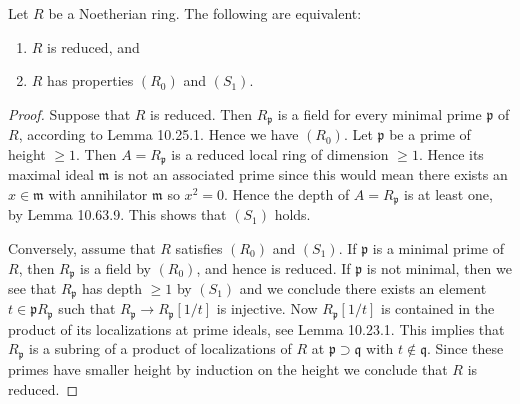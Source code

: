 \begin{lemma}[10.157.3, Tag 031R]
Let $R$ be a Noetherian ring. The following are equivalent:
\begin{enumerate}
\item $R$ is reduced, and
\item $R$ has properties $(R_0)$ and $(S_1)$.
\end{enumerate}
\end{lemma}
\begin{proof}
Suppose that $R$ is reduced. Then $R_{\mathfrak p}$ is a field for every minimal prime $\mathfrak p$ of $R$, according to Lemma 10.25.1. Hence we have $(R_0)$. Let $\mathfrak p$ be a prime of height $\geq1$. Then $A=R_{\mathfrak p}$ is a reduced local ring of dimension $\geq1$. Hence its maximal ideal $\mathfrak m$ is not an associated prime since this would mean there exists an $x\in\mathfrak m$ with annihilator $\mathfrak m$ so $x^2=0$. Hence the depth of $A=R_{\mathfrak p}$ is at least one, by Lemma 10.63.9. This shows that $(S_1)$ holds.

Conversely, assume that $R$ satisfies $(R_0)$ and $(S_1)$. If $\mathfrak p$ is a minimal prime of $R$, then $R_{\mathfrak p}$ is a field by $(R_0)$, and hence is reduced. If $\mathfrak p$ is not minimal, then we see that $R_{\mathfrak p}$ has depth $\geq1$ by $(S_1)$ and we conclude there exists an element $t\in\mathfrak pR_{\mathfrak p}$ such that $R_{\mathfrak p}\to R_{\mathfrak p}[1/t]$ is injective. Now $R_{\mathfrak p}[1/t]$ is contained in the product of its localizations at prime ideals, see Lemma 10.23.1. This implies that $R_{\mathfrak p}$ is a subring of a product of localizations of $R$ at $\mathfrak p\supset\mathfrak q$ with $t\notin\mathfrak q$. Since these primes have smaller height by induction on the height we conclude that $R$ is reduced.
\end{proof}

